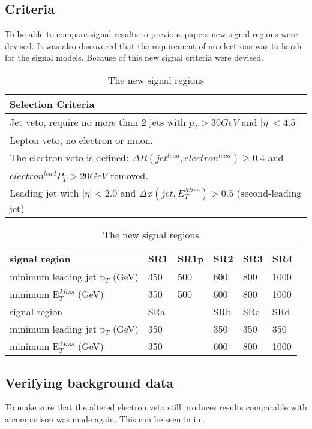 \subsection{Criteria}
To be able to compare signal results to previous papers new signal regions were devised. It was also discovered that the requirement of no electrons was to harsh for the signal models. Because of this new signal criteria were devised.

\begin{table}[h]
\begin{center}
\begin{tabular}{l}
\hline
Selection Criteria \\ \hline
Jet veto, require no more than 2 jets with $p_T > 30 GeV$ and $|\eta| < 4.5$ \\
Lepton veto, no electron or muon. \\
The electron veto is defined: $\Delta R (jet^{lead},electron^{lead})\geq 0.4$ and \\
$electron^{lead} P_T>20 GeV$ removed.\\
Leading jet with $|\eta| < 2.0$ and $\Delta \phi (jet, E_T^{Miss})>0.5$ (second-leading jet) \\ 
\end{tabular}
\begin{tabular}{l l l l l l}
\hline
signal region & SR1 & SR1p & SR2 & SR3 & SR4 \\ \hline
minimum leading jet p$_T$ (GeV) & 350 &500& 600 & 800 & 1000 \\
minimum E$^{Miss}_T$ (GeV) & 350&500 & 600 & 800 & 1000 \\ \hline
signal region & SRa &  & SRb & SRc & SRd \\ \hline
minimum leading jet p$_T$ (GeV) & 350 & & 350 & 350 & 350 \\
minimum E$^{Miss}_T$ (GeV) & 350 & & 600 & 800 & 1000 \\ \hline
\end{tabular}
\label{tab:newsr}
\caption{The new signal regions}
\end{center}
\end{table}

\subsection{Verifying background data}
To make sure that the altered electron veto still produces results comparable with \citep{ATLAS-CONF-2012-147} a comparison was made again. This can be seen in  in .

